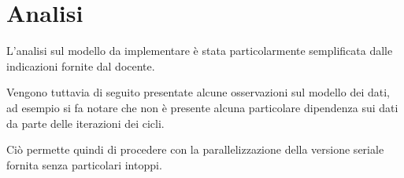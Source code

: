 \section{Analisi}
L'analisi sul modello da implementare è stata particolarmente semplificata dalle
indicazioni fornite dal docente.

Vengono tuttavia di seguito presentate alcune osservazioni sul modello dei dati,
ad esempio si fa notare che non è presente alcuna particolare dipendenza sui
dati da parte delle iterazioni dei cicli.

Ciò permette quindi di procedere con la parallelizzazione della versione seriale
fornita senza particolari intoppi.
